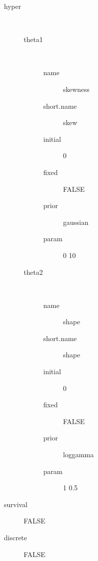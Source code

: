 \begin{description}
	\item[hyper]\ 
	 \begin{description}
	 	\item[theta1]\ 
	 	 \begin{description}
	 	 	 \item[ name ] skewness 
	 	 	 \item[ short.name ] skew 
	 	 	 \item[ initial ] 0 
	 	 	 \item[ fixed ] FALSE 
	 	 	 \item[ prior ] gaussian 
	 	 	 \item[ param ] 0 10 
	 	 \end{description}
	 	\item[theta2]\ 
	 	 \begin{description}
	 	 	 \item[ name ] shape 
	 	 	 \item[ short.name ] shape 
	 	 	 \item[ initial ] 0 
	 	 	 \item[ fixed ] FALSE 
	 	 	 \item[ prior ] loggamma 
	 	 	 \item[ param ] 1 0.5 
	 	 \end{description}
	 \end{description}
	 \item[ survival ] FALSE 
	 \item[ discrete ] FALSE 
\end{description}
